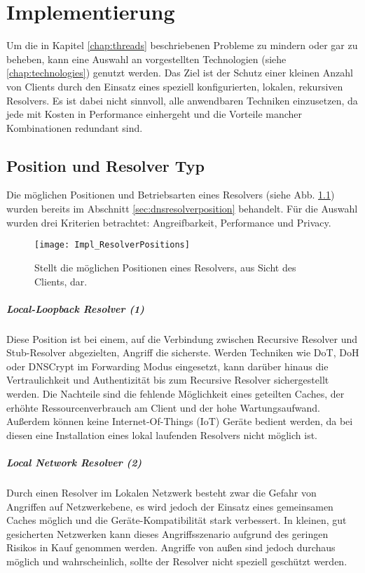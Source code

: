 \chapter{Implementierung}
\label{chap:implementation}

Um die in Kapitel \ref{chap:threads} beschriebenen Probleme zu mindern oder gar zu beheben, kann eine Auswahl an vorgestellten Technologien (siehe \ref{chap:technologies}) genutzt werden. Das Ziel ist der Schutz einer kleinen Anzahl von Clients durch den Einsatz eines speziell konfigurierten, lokalen, rekursiven Resolvers. Es ist dabei nicht sinnvoll, alle anwendbaren Techniken einzusetzen, da jede mit Kosten in Performance einhergeht und die Vorteile mancher Kombinationen redundant sind.

\section{Position und Resolver Typ}
Die möglichen Positionen und Betriebsarten eines Resolvers (siehe Abb. \ref{img:impl-resolverpositions}) wurden bereits im Abschnitt \ref{sec:dnsresolverposition} behandelt. Für die Auswahl wurden drei Kriterien betrachtet: Angreifbarkeit, Performance und Privacy.
\begin{figure}[hb]
    \centering
    \texttt{[image: Impl\_ResolverPositions]}
    \caption{Stellt die möglichen Positionen eines Resolvers, aus Sicht des Clients, dar.}
    \label{img:impl-resolverpositions}
\end{figure}

\paragraph{Local-Loopback Resolver (1)}
Diese Position ist bei einem, auf die Verbindung zwischen Recursive Resolver und Stub-Resolver abgezielten, Angriff die sicherste. Werden Techniken wie DoT, DoH oder DNSCrypt im Forwarding Modus eingesetzt, kann darüber hinaus die Vertraulichkeit und Authentizität bis zum Recursive Resolver sichergestellt werden. Die Nachteile sind die fehlende Möglichkeit eines geteilten Caches, der erhöhte Ressourcenverbrauch am Client und der hohe Wartungsaufwand. Außerdem können keine Internet-Of-Things (IoT) Geräte bedient werden, da bei diesen eine Installation eines lokal laufenden Resolvers nicht möglich ist.

\paragraph{Local Network Resolver (2)}
Durch einen Resolver im Lokalen Netzwerk besteht zwar die Gefahr von Angriffen auf Netzwerkebene, es wird jedoch der Einsatz eines gemeinsamen Caches möglich und die Geräte-Kompatibilität stark verbessert. In kleinen, gut gesicherten Netzwerken kann dieses Angriffsszenario aufgrund des geringen Risikos in Kauf genommen werden. Angriffe von außen sind jedoch durchaus möglich und wahrscheinlich, sollte der Resolver nicht speziell geschützt werden.


